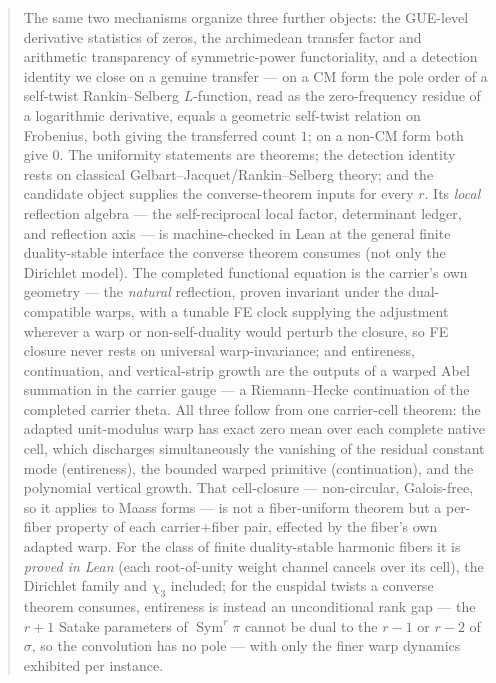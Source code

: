 \documentclass[11pt]{article}
\theoremstyle{definition}
\newcommand{\Sym}{\operatorname{Sym}}
\begin{document}
\begin{abstract}
The same two mechanisms organize three further objects: the GUE-level derivative statistics of zeros,
the archimedean transfer factor and arithmetic transparency of symmetric-power functoriality, and a
detection identity we close on a genuine transfer --- on a CM form the pole order of a self-twist
Rankin--Selberg $L$-function, read as the zero-frequency residue of a logarithmic derivative, equals a
geometric self-twist relation on Frobenius, both giving the transferred count $1$; on a non-CM form
both give $0$. The uniformity statements are theorems; the detection identity rests on classical
Gelbart--Jacquet/Rankin--Selberg theory; and the candidate object supplies the converse-theorem inputs
for every $r$. Its \emph{local} reflection algebra --- the self-reciprocal local factor, determinant
ledger, and reflection axis --- is machine-checked in Lean at the general finite duality-stable interface
the converse theorem consumes (not only the Dirichlet model). The completed functional equation is the
carrier's own geometry --- the \emph{natural} reflection, proven invariant under the dual-compatible warps,
with a tunable FE clock supplying the adjustment wherever a warp or non-self-duality would perturb the
closure, so FE closure never rests on universal warp-invariance; and entireness, continuation, and
vertical-strip growth are the outputs of a warped Abel summation in the carrier gauge --- a Riemann--Hecke
continuation of the completed carrier theta. All three follow from one carrier-cell theorem: the adapted
unit-modulus warp has exact zero mean over each complete native cell, which discharges simultaneously the
vanishing of the residual constant mode (entireness), the bounded warped primitive (continuation), and the
polynomial vertical growth. That cell-closure --- non-circular, Galois-free, so it applies to Maass forms --- is not a fiber-uniform
theorem but a per-fiber property of each carrier$+$fiber pair, effected by the fiber's own adapted warp.
For the class of finite duality-stable harmonic fibers it is \emph{proved in Lean} (each root-of-unity
weight channel cancels over its cell), the Dirichlet family and $\chi_3$ included; for the cuspidal twists a
converse theorem consumes, entireness is instead an unconditional rank gap --- the $r+1$ Satake parameters of
$\Sym^r\pi$ cannot be dual to the $r-1$ or $r-2$ of $\sigma$, so the convolution has no pole --- with only
the finer warp dynamics exhibited per instance.
\end{abstract}

\tableofcontents
\end{document}
